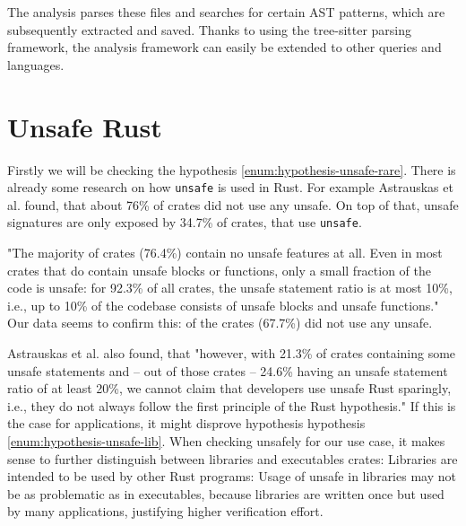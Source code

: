 \documentclass{book}
\newcommand{\code}[1]{\texttt{#1}}
\theoremstyle{definition}
\begin{document}

The analysis parses these files and searches for certain AST patterns, which are subsequently extracted and saved.
Thanks to using the tree-sitter parsing framework, the analysis framework can easily be extended to other queries and languages.

\label{ss:unsafe-rust}\section{Unsafe Rust}

Firstly we will be checking the hypothesis \ref{enum:hypothesis-unsafe-rare}.
There is already some research on how \code{unsafe} is used in Rust. For example Astrauskas et al. \cite{astrauskas_how_2020} found, that about 76\% of crates did not use any unsafe. On top of that, unsafe signatures are only exposed by 34.7\% of crates, that use \code{unsafe}.

"The majority of crates (76.4\%) contain no unsafe features at all. Even in most crates that do contain unsafe blocks or functions, only a small fraction of the code is unsafe: for 92.3\% of all crates, the unsafe statement ratio is at most 10\%, i.e., up to 10\% of the codebase consists of unsafe blocks and unsafe functions." \cite[p. 13]{astrauskas_how_2020}
Our data seems to confirm this:  of the  crates (67.7\%) did not use any unsafe. 

Astrauskas et al. also found, that "however, with 21.3\% of crates containing some unsafe statements and – out of those crates – 24.6\% having an unsafe statement ratio of at least 20\%, we cannot claim that developers use unsafe Rust sparingly, i.e., they do not always follow the first principle of the Rust hypothesis." \cite[p. 14]{astrauskas_how_2020}
If this is the case for applications, it might disprove hypothesis hypothesis \ref{enum:hypothesis-unsafe-lib}. 
When checking unsafely for our use case, it makes sense to further distinguish between libraries and executables crates: Libraries are intended to be used by other Rust programs: Usage of unsafe in libraries may not be as problematic as in executables, because libraries are written once but used by many applications, justifying higher verification effort. 
\end{document}
